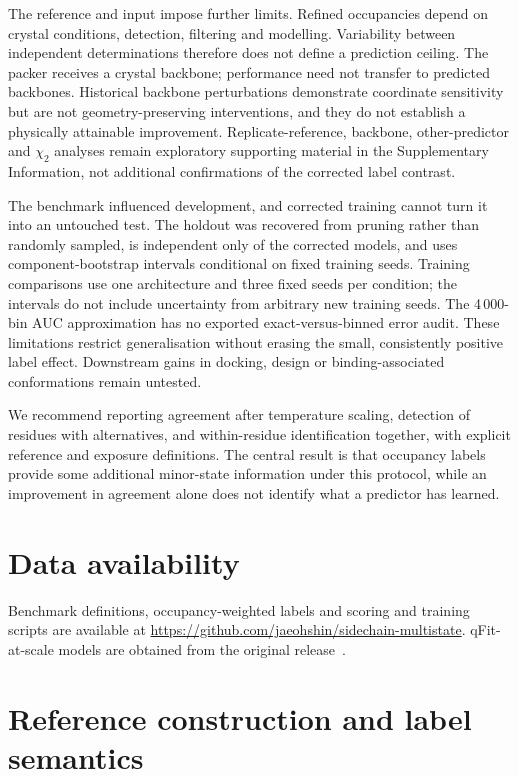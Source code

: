 \documentclass[10pt,twocolumn,a4paper]{article}
\begin{document}
The reference and input impose further limits. Refined occupancies depend on crystal conditions, detection, filtering and modelling. Variability between independent determinations therefore does not define a prediction ceiling. The packer receives a crystal backbone; performance need not transfer to predicted backbones. Historical backbone perturbations demonstrate coordinate sensitivity but are not geometry-preserving interventions, and they do not establish a physically attainable improvement. Replicate-reference, backbone, other-predictor and $\chi_2$ analyses remain exploratory supporting material in the Supplementary Information, not additional confirmations of the corrected label contrast.

The benchmark influenced development, and corrected training cannot turn it into an untouched test. The holdout was recovered from pruning rather than randomly sampled, is independent only of the corrected models, and uses component-bootstrap intervals conditional on fixed training seeds. Training comparisons use one architecture and three fixed seeds per condition; the intervals do not include uncertainty from arbitrary new training seeds. The 4\,000-bin AUC approximation has no exported exact-versus-binned error audit. These limitations restrict generalisation without erasing the small, consistently positive label effect. Downstream gains in docking, design or binding-associated conformations remain untested.

We recommend reporting agreement after temperature scaling, detection of residues with alternatives, and within-residue identification together, with explicit reference and exposure definitions. The central result is that occupancy labels provide some additional minor-state information under this protocol, while an improvement in agreement alone does not identify what a predictor has learned.

\section*{Data availability}
Benchmark definitions, occupancy-weighted labels and scoring and training scripts are available at \url{https://github.com/jaeohshin/sidechain-multistate}. qFit-at-scale models are obtained from the original release~\citep{wankowicz2026qfitatscale}.
\clearpage
\appendix
\setcounter{figure}{0}
\renewcommand{\thefigure}{A\arabic{figure}}
\section{Reference construction and label semantics}\label{app:labels}
\end{document}
